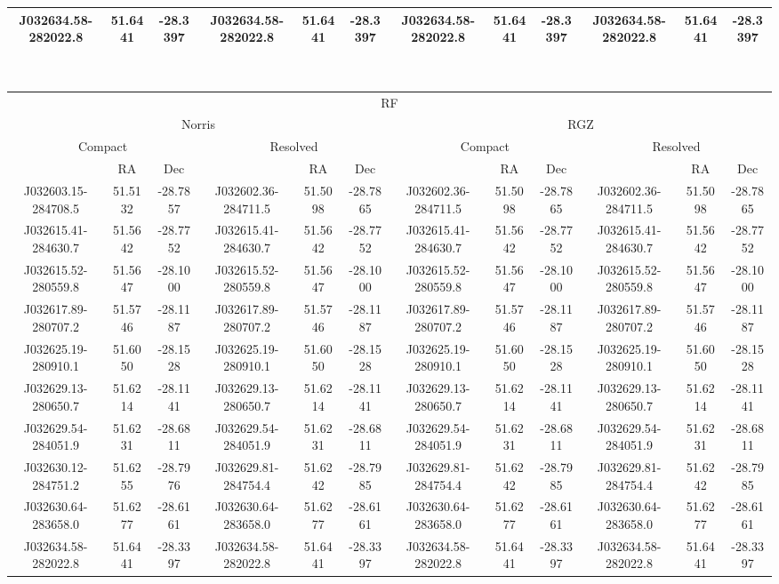 \begin{table}
\begin{tabular}{cccccccccccc}
J032634.58-282022.8 & 51.6441 & -28.3397 & J032634.58-282022.8 & 51.6441 & -28.3397 & J032634.58-282022.8 & 51.6441 & -28.3397 & J032634.58-282022.8 & 51.6441 & -28.3397\\
      \hline\hline
    \end{tabular}\\
    \begin{tabular}{cccccccccccc}
      \hline\hline
\multicolumn{12}{c}{RF} \\
 \multicolumn{6}{c}{Norris} & \multicolumn{6}{c}{RGZ} \\
 \multicolumn{3}{c}{Compact} & \multicolumn{3}{c}{Resolved} & \multicolumn{3}{c}{Compact} & \multicolumn{3}{c}{Resolved} \\
  & RA & Dec & & RA & Dec & & RA & Dec & & RA & Dec \\
      \hline
J032603.15-284708.5 & 51.5132 & -28.7857 & J032602.36-284711.5 & 51.5098 & -28.7865 & J032602.36-284711.5 & 51.5098 & -28.7865 & J032602.36-284711.5 & 51.5098 & -28.7865 \\
J032615.41-284630.7 & 51.5642 & -28.7752 & J032615.41-284630.7 & 51.5642 & -28.7752 & J032615.41-284630.7 & 51.5642 & -28.7752 & J032615.41-284630.7 & 51.5642 & -28.7752 \\
J032615.52-280559.8 & 51.5647 & -28.1000 & J032615.52-280559.8 & 51.5647 & -28.1000 & J032615.52-280559.8 & 51.5647 & -28.1000 & J032615.52-280559.8 & 51.5647 & -28.1000 \\
J032617.89-280707.2 & 51.5746 & -28.1187 & J032617.89-280707.2 & 51.5746 & -28.1187 & J032617.89-280707.2 & 51.5746 & -28.1187 & J032617.89-280707.2 & 51.5746 & -28.1187 \\
J032625.19-280910.1 & 51.6050 & -28.1528 & J032625.19-280910.1 & 51.6050 & -28.1528 & J032625.19-280910.1 & 51.6050 & -28.1528 & J032625.19-280910.1 & 51.6050 & -28.1528 \\
J032629.13-280650.7 & 51.6214 & -28.1141 & J032629.13-280650.7 & 51.6214 & -28.1141 & J032629.13-280650.7 & 51.6214 & -28.1141 & J032629.13-280650.7 & 51.6214 & -28.1141 \\
J032629.54-284051.9 & 51.6231 & -28.6811 & J032629.54-284051.9 & 51.6231 & -28.6811 & J032629.54-284051.9 & 51.6231 & -28.6811 & J032629.54-284051.9 & 51.6231 & -28.6811 \\
J032630.12-284751.2 & 51.6255 & -28.7976 & J032629.81-284754.4 & 51.6242 & -28.7985 & J032629.81-284754.4 & 51.6242 & -28.7985 & J032629.81-284754.4 & 51.6242 & -28.7985 \\
J032630.64-283658.0 & 51.6277 & -28.6161 & J032630.64-283658.0 & 51.6277 & -28.6161 & J032630.64-283658.0 & 51.6277 & -28.6161 & J032630.64-283658.0 & 51.6277 & -28.6161 \\
J032634.58-282022.8 & 51.6441 & -28.3397 & J032634.58-282022.8 & 51.6441 & -28.3397 & J032634.58-282022.8 & 51.6441 & -28.3397 & J032634.58-282022.8 & 51.6441 & -28.3397 \\
      \hline\hline
    \end{tabular}
  \end{table}

